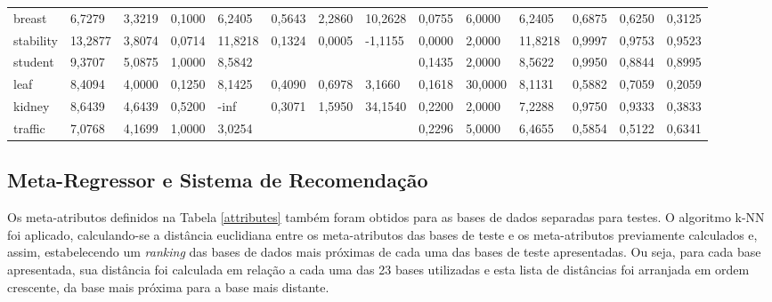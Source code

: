\documentclass[runningheads]{llncs}
\begin{document}
\begin{table}[ht]
\begin{adjustbox}{width=1\textwidth}
\begin{tabular}{|l|l|l|l|l|l|l|l|l|l|l|l|l|l|}
breast     & 6,7279   & 3,3219     & 0,1000          & 6,2405        & 0,5643            & 2,2860     & 10,2628        & 0,0755   & 6,0000  & 6,2405  & 0,6875         & 0,6250          & 0,3125           \\
stability  & 13,2877  & 3,8074     & 0,0714          & 11,8218       & 0,1324            & 0,0005     & -1,1155        & 0,0000   & 2,0000  & 11,8218 & 0,9997         & 0,9753          & 0,9523           \\
student    & 9,3707   & 5,0875     & 1,0000          & 8,5842        &                   &            &                & 0,1435   & 2,0000  & 8,5622  & 0,9950         & 0,8844          & 0,8995           \\
leaf       & 8,4094   & 4,0000     & 0,1250          & 8,1425        & 0,4090            & 0,6978     & 3,1660         & 0,1618   & 30,0000 & 8,1131  & 0,5882         & 0,7059          & 0,2059           \\
kidney     & 8,6439   & 4,6439     & 0,5200          & -inf          & 0,3071            & 1,5950     & 34,1540        & 0,2200   & 2,0000  & 7,2288  & 0,9750         & 0,9333          & 0,3833           \\
traffic    & 7,0768   & 4,1699     & 1,0000          & 3,0254        &                   &            &                & 0,2296   & 5,0000  & 6,4655  & 0,5854         & 0,5122          & 0,6341           \\ \hline
\end{tabular}
\end{adjustbox}
\end{table}

\subsection{Meta-Regressor e Sistema de Recomendação}

Os meta-atributos definidos na Tabela \ref{attributes} também foram obtidos para as bases de dados separadas para testes. O algoritmo k-NN foi aplicado, calculando-se a distância euclidiana entre os meta-atributos das bases de teste e os meta-atributos previamente calculados e, assim, estabelecendo um \emph{ranking} das bases de dados mais próximas de cada uma das bases de teste apresentadas. Ou seja, para cada base apresentada, sua distância foi calculada em relação a cada uma das 23 bases utilizadas e esta lista de distâncias foi arranjada em ordem crescente, da base mais próxima para a base mais distante.
\end{document}
